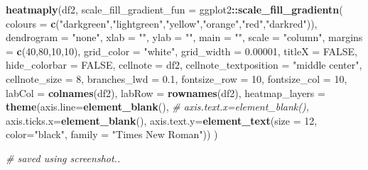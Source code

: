 \documentclass[
]{article}
\newenvironment{Shaded}{\begin{snugshade}}{\end{snugshade}}
\newcommand{\AttributeTok}[1]{\textcolor[rgb]{0.13,0.29,0.53}{#1}}
\newcommand{\CommentTok}[1]{\textcolor[rgb]{0.56,0.35,0.01}{\textit{#1}}}
\newcommand{\ConstantTok}[1]{\textcolor[rgb]{0.56,0.35,0.01}{#1}}
\newcommand{\DecValTok}[1]{\textcolor[rgb]{0.00,0.00,0.81}{#1}}
\newcommand{\FloatTok}[1]{\textcolor[rgb]{0.00,0.00,0.81}{#1}}
\newcommand{\FunctionTok}[1]{\textcolor[rgb]{0.13,0.29,0.53}{\textbf{#1}}}
\newcommand{\NormalTok}[1]{#1}
\newcommand{\SpecialCharTok}[1]{\textcolor[rgb]{0.81,0.36,0.00}{\textbf{#1}}}
\newcommand{\StringTok}[1]{\textcolor[rgb]{0.31,0.60,0.02}{#1}}
\begin{document}
\begin{Shaded}
\begin{Highlighting}[]
\FunctionTok{heatmaply}\NormalTok{(df2,}
              \AttributeTok{scale\_fill\_gradient\_fun =}\NormalTok{ ggplot2}\SpecialCharTok{::}\FunctionTok{scale\_fill\_gradientn}\NormalTok{(}
                \AttributeTok{colours =} \FunctionTok{c}\NormalTok{(}\StringTok{"darkgreen"}\NormalTok{,}\StringTok{"lightgreen"}\NormalTok{,}\StringTok{"yellow"}\NormalTok{,}\StringTok{"orange"}\NormalTok{,}\StringTok{"red"}\NormalTok{,}\StringTok{"darkred"}\NormalTok{)),}
              \AttributeTok{dendrogram =} \StringTok{"none"}\NormalTok{,}
              \AttributeTok{xlab =} \StringTok{""}\NormalTok{, }\AttributeTok{ylab =} \StringTok{""}\NormalTok{,}
              \AttributeTok{main =} \StringTok{""}\NormalTok{,}
              \AttributeTok{scale =} \StringTok{"column"}\NormalTok{,}
              \AttributeTok{margins =} \FunctionTok{c}\NormalTok{(}\DecValTok{40}\NormalTok{,}\DecValTok{80}\NormalTok{,}\DecValTok{10}\NormalTok{,}\DecValTok{10}\NormalTok{),}
              \AttributeTok{grid\_color =} \StringTok{"white"}\NormalTok{,}
              \AttributeTok{grid\_width =} \FloatTok{0.00001}\NormalTok{,}
              \AttributeTok{titleX =} \ConstantTok{FALSE}\NormalTok{,}
              \AttributeTok{hide\_colorbar =} \ConstantTok{FALSE}\NormalTok{,}
              \AttributeTok{cellnote =}\NormalTok{ df2,}
              \AttributeTok{cellnote\_textposition =} \StringTok{"middle center"}\NormalTok{,}
              \AttributeTok{cellnote\_size =} \DecValTok{8}\NormalTok{,}
              \AttributeTok{branches\_lwd =} \FloatTok{0.1}\NormalTok{,}
              \AttributeTok{fontsize\_row =} \DecValTok{10}\NormalTok{,}
              \AttributeTok{fontsize\_col =} \DecValTok{10}\NormalTok{,}
              \AttributeTok{labCol =} \FunctionTok{colnames}\NormalTok{(df2),}
              \AttributeTok{labRow =} \FunctionTok{rownames}\NormalTok{(df2),}
              \AttributeTok{heatmap\_layers =} \FunctionTok{theme}\NormalTok{(}\AttributeTok{axis.line=}\FunctionTok{element\_blank}\NormalTok{(),}
                                     \CommentTok{\# axis.text.x=element\_blank(),}
                                     \AttributeTok{axis.ticks.x=}\FunctionTok{element\_blank}\NormalTok{(),}
                                     \AttributeTok{axis.text.y=}\FunctionTok{element\_text}\NormalTok{(}\AttributeTok{size =} \DecValTok{12}\NormalTok{,}
                                                              \AttributeTok{color=}\StringTok{"black"}\NormalTok{,}
                                                              \AttributeTok{family =} \StringTok{"Times New Roman"}\NormalTok{))}
\NormalTok{)}

 \CommentTok{\# saved using screenshot..}
\end{Highlighting}
\end{Shaded}
\end{document}
